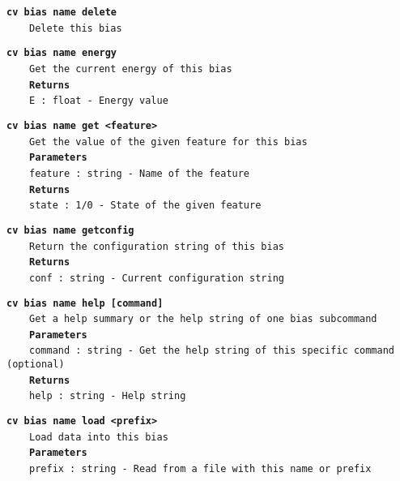 \begin{mdexampleinput}{}
\texttt{\textbf{cv bias name delete}}
\\
\-~~~~\texttt{Delete this bias}
\end{mdexampleinput}
\begin{mdexampleinput}{}
\texttt{\textbf{cv bias name energy}}
\\
\-~~~~\texttt{Get the current energy of this bias}
\\
\-~~~~\texttt{\textbf{Returns}}
\\
\-~~~~\texttt{E : float - Energy value}
\end{mdexampleinput}
\begin{mdexampleinput}{}
\texttt{\textbf{cv bias name get <feature>}}
\\
\-~~~~\texttt{Get the value of the given feature for this bias}
\\
\-~~~~\texttt{\textbf{Parameters}}
\\
\-~~~~\texttt{feature : string - Name of the feature}
\\
\-~~~~\texttt{\textbf{Returns}}
\\
\-~~~~\texttt{state : 1/0 - State of the given feature}
\end{mdexampleinput}
\begin{mdexampleinput}{}
\texttt{\textbf{cv bias name getconfig}}
\\
\-~~~~\texttt{Return the configuration string of this bias}
\\
\-~~~~\texttt{\textbf{Returns}}
\\
\-~~~~\texttt{conf : string - Current configuration string}
\end{mdexampleinput}
\begin{mdexampleinput}{}
\texttt{\textbf{cv bias name help [command]}}
\\
\-~~~~\texttt{Get a help summary or the help string of one bias subcommand}
\\
\-~~~~\texttt{\textbf{Parameters}}
\\
\-~~~~\texttt{command : string - Get the help string of this specific command (optional)}
\\
\-~~~~\texttt{\textbf{Returns}}
\\
\-~~~~\texttt{help : string - Help string}
\end{mdexampleinput}
\begin{mdexampleinput}{}
\texttt{\textbf{cv bias name load <prefix>}}
\\
\-~~~~\texttt{Load data into this bias}
\\
\-~~~~\texttt{\textbf{Parameters}}
\\
\-~~~~\texttt{prefix : string - Read from a file with this name or prefix}
\end{mdexampleinput}
